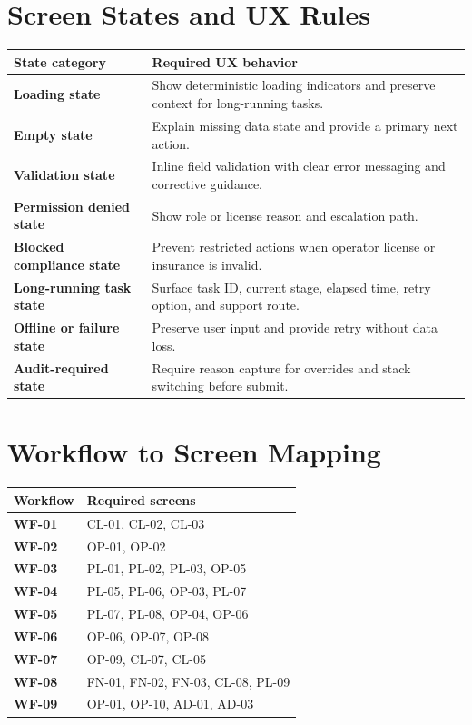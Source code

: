 \documentclass[11pt,a4paper]{article}
\begin{document}
\section{Screen States and UX Rules}

\begin{longtable}{>{\bfseries}p{}p{}}
\toprule
State category & Required UX behavior \\
\midrule
Loading state & Show deterministic loading indicators and preserve context for long-running tasks. \\
Empty state & Explain missing data state and provide a primary next action. \\
Validation state & Inline field validation with clear error messaging and corrective guidance. \\
Permission denied state & Show role or license reason and escalation path. \\
Blocked compliance state & Prevent restricted actions when operator license or insurance is invalid. \\
Long-running task state & Surface task ID, current stage, elapsed time, retry option, and support route. \\
Offline or failure state & Preserve user input and provide retry without data loss. \\
Audit-required state & Require reason capture for overrides and stack switching before submit. \\
\bottomrule
\end{longtable}

\section{Workflow to Screen Mapping}

\begin{longtable}{>{\bfseries}p{}p{}}
\toprule
Workflow & Required screens \\
\midrule
WF-01 & CL-01, CL-02, CL-03 \\
WF-02 & OP-01, OP-02 \\
WF-03 & PL-01, PL-02, PL-03, OP-05 \\
WF-04 & PL-05, PL-06, OP-03, PL-07 \\
WF-05 & PL-07, PL-08, OP-04, OP-06 \\
WF-06 & OP-06, OP-07, OP-08 \\
WF-07 & OP-09, CL-07, CL-05 \\
WF-08 & FN-01, FN-02, FN-03, CL-08, PL-09 \\
WF-09 & OP-01, OP-10, AD-01, AD-03 \\
\bottomrule
\end{longtable}
\end{document}
